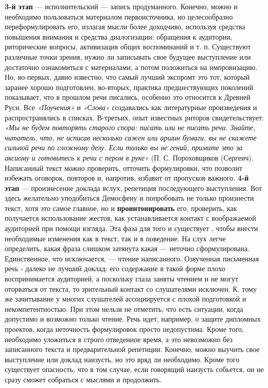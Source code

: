 {{ \textbf{3-й этап} — исполнительский — запись продуманного. Конечно, можно и необходимо пользоваться материалом первоисточника, но целесообразно переформулировать его, излагая мысли более доходчиво, используя средства повышения внимания и средства диалогизации: обращения к аудитории, риторические вопросы, активизация общих воспоминаний и т. п. Существуют различные точки зрения, нужно ли записывать свое будущее выступление или достаточно ознакомиться с материалами, а потом положиться на импровизацию. Но, во-первых, давно известно, что самый лучший экспромт это тот, который заранее хорошо подготовлен, во-вторых, практика предшествующих поколений показывает, что в прошлом речи писались, особенно это относится к Древней Руси. Все \textit{«Поучения»} и \textit{«Слова»} создавались как литературные произведения и распространялись в списках. В-третьих, опыт известных риторов свидетельствует: \textit{«Мы не будем повторять старого спора: писать или не писать речи. Знайте, читатель, что, не исписав несколько сажен или аршин бумаги, вы не скажете сильной речи по сложному делу. Если только вы не гений, примите это за аксиому и готовьтесь к речи с пером в руке»} (П. С. Пороховщиков (Сергеич). Написанный текст можно проверить, отточить формулировки, что позволит избежать оговорок, повторов и, напротив, избавит от пропусков важного. \textbf{4-й этап} — произнесение доклада вслух, репетиция последующего выступления. Вот здесь желательно уподобиться Демосфену и попробовать не только произнести текст, хотя это самое главное, но и \textbf{проинтонировать} его, проверить, как получается использование жестов, как устанавливается контакт с воображаемой аудиторией при помощи взгляда. Эта фаза для того и существует , чтобы внести необходимые изменения как в текст, так и в поведение. На слух легче определить, какая фраза слишком затянута какая — неточно сформулирована. Единственное, что исключается, — чтение написанного. Озвученная письменная речь - далеко не лучший доклад: его содержание в такой форме плохо воспринимается аудиторией, а поскольку глаза заняты чтением и не могут оторваться от текста, то зрительный контакт со  слушателями исключен. К. тому же зачитывание у многих слушателей ассоциируется с плохой подготовкой и некомпетентностью. При этом нельзя не отметить, что есть ситуации, когда допустимо и возможно только чтение. Речь идет, например, о защите дипломных проектов, когда неточность формулировок просто недопустима. Кроме того, необходимо уложиться в строго отведенное время, а это невозможно без записанного текста и предварительной репетиции. Конечно, можно выучить свое выступление или доклад наизусть, но это вряд ли необходимо. Кроме того существует опасность, что в том случае, если говорящий наизусть собьется, он не сразу сможет собраться с мыслями и продолжить.

}}
